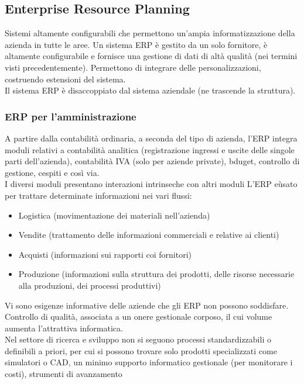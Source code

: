 \begin{itemize}
\subsection{Enterprise Resource Planning}
\label{sub:Enterprise Resource Planning}
Sistemi altamente configurabili che permettono un'ampia informatizzazione
della azienda in tutte le aree. Un sistema ERP \`e gestito da un solo fornitore,
\`e altamente configurabile e fornisce una gestione di dati di alt\`a qualit\`a
(nei termini visti precedentemente). Permettono di integrare delle personalizzazioni,
costruendo estensioni del sistema.\\
Il sistema ERP \`e disaccoppiato dal sistema aziendale (ne trascende la struttura).\\
\subsubsection{ERP per l'amministrazione}
\label{subs:ERP per l'amministrazione}
A partire dalla contabilit\`a ordinaria, a seconda del tipo di azienda, l'ERP integra moduli
relativi a contabilit\`a analitica (registrazione ingressi e uscite delle singole parti dell'azienda),
contabilit\`a IVA (solo per aziende private), bduget, controllo di gestione, cespiti e cos\`i via.\\
I diversi moduli presentano interazioni intrinseche con altri moduli
L'ERP e\`usato per trattare determinate informazioni nei vari flussi:
\begin{itemize}
  \item Logistica (movimentazione dei materiali nell'azienda)
  \item Vendite (trattamento delle informazioni commerciali e relative ai clienti)
  \item Acquisti (informazioni sui rapporti coi fornitori)
  \item Produzione (informazioni sulla struttura dei prodotti, delle risorse necessarie
  alla produzioni, dei processi produttivi)
\end{itemize}
Vi sono esigenze informative delle aziende che gli ERP non possono soddisfare.\\
Controllo di qualit\`a, associata a un onere gestionale corposo, il cui volume aumenta
l'attrattiva informatica.\\
Nel settore di ricerca e sviluppo non si seguono processi standardizzabili o definibili
a priori, per cui si possono trovare solo prodotti specializzati come simulatori o CAD,
un minimo supporto informatico gestionale (per monitorare i costi), strumenti di avanzamento

\end{itemize}

